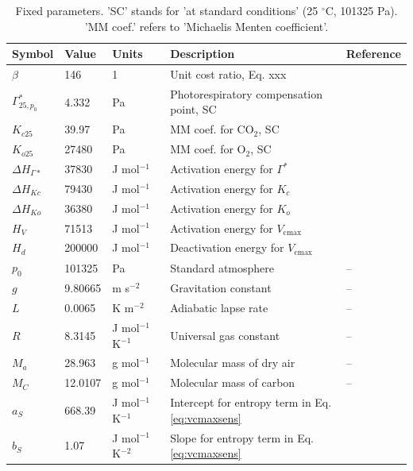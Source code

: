 \documentclass{myreport}
\newcommand{\vcmax}{$V_{\text{cmax}}$}
\begin{document}
\begin{table}
\centering
\begin{tabular}{lllll}
	\toprule
    Symbol     & Value   & Units         & Description           &  Reference   \\
	\midrule
    $\beta$      & 146     & 1             & Unit cost ratio, Eq. xxx & \cite{Wang2017-ls} \\
	$\Gamma^\ast_{25, p_0}$ & 4.332 & Pa & Photorespiratory compensation point, SC & \cite{bernacchi01} \\
	$K_{c25}$    & 39.97   & Pa            & MM coef. for CO$_2$, SC&  \cite{bernacchi01} \\
	$K_{o25}$    & 27480   & Pa            & MM coef. for O$_2$, SC&  \cite{bernacchi01} \\
	$\Delta H_{\Gamma\ast}$ & 37830 & J mol$^{-1}$ & Activation energy for $\Gamma^\ast$  & \cite{bernacchi01} \\
	$\Delta H_{Kc}$ & 79430  & J mol$^{-1}$  & Activation energy for $K_c$&  \cite{bernacchi01} \\
	$\Delta H_{Ko}$ & 36380  & J mol$^{-1}$  & Activation energy for $K_o$&  \cite{bernacchi01} \\
	$H_V$        & 71513   & J mol$^{-1}$  & Activation energy for \vcmax\ & \cite{kattge07} \\
	$H_d$        & 200000   & J mol$^{-1}$  & Deactivation energy for \vcmax\ & \cite{kattge07} \\
	$p_0$        & 101325  & Pa            & Standard atmosphere   & -- \\
	$g$          & 9.80665 & m s$^{-2}$    & Gravitation constant  & -- \\
	$L$          & 0.0065  & K m$^{-2}$    & Adiabatic lapse rate  & -- \\
	$R$          & 8.3145  & J mol$^{-1}$ K$^{-1}$ & Universal gas constant & -- \\
	$M_a$        & 28.963  & g mol$^{-1}$  & Molecular mass of dry air & -- \\
    $M_C$        & 12.0107 & g mol$^{-1} $ & Molecular mass of carbon & -- \\ 
	$a_S$        & 668.39  & J mol$^{-1}$ K$^{-1}$ & Intercept for entropy term in Eq. \ref{eq:vcmaxsens} & \cite{kattge07} \\
	$b_S$        & 1.07  & J mol$^{-1}$ K$^{-2}$ & Slope for entropy term in Eq. \ref{eq:vcmaxsens} & \cite{kattge07} \\
	\bottomrule
\end{tabular}
\caption{Fixed parameters. 'SC' stands for 'at standard conditions' (25 $^{\circ}$C, 101325 Pa). 'MM coef.' refers to 'Michaelis Menten coefficient'.}
\label{tab:params}
\end{table}
\end{document}
